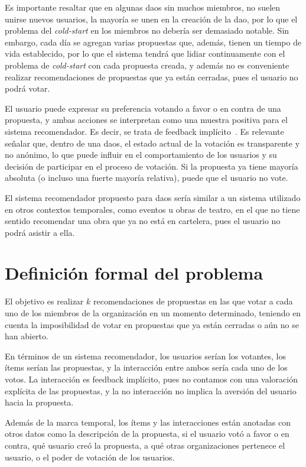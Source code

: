 Es importante resaltar que en algunas \glspl{dao} sin muchos miembros, no suelen unirse nuevos usuarios, la mayoría se unen en la creación de la \gls{dao}, por lo que el problema del \textit{cold-start} en los miembros no debería ser demasiado notable. Sin embargo, cada día se agregan varias propuestas que, además, tienen un tiempo de vida establecido, por lo que el sistema tendrá que lidiar continuamente con el problema de \textit{cold-start} con cada propuesta creada, y además no es conveniente realizar recomendaciones de propuestas que ya están cerradas, pues el usuario no podrá votar.

El usuario puede expresar su preferencia votando a favor o en contra de una propuesta, y ambas acciones se interpretan como una muestra positiva para el sistema recomendador. Es decir, se trata de feedback implícito~\cite{oard_implicit_1998}. Es relevante señalar que, dentro de una \glspl{dao}, el estado actual de la votación es transparente y no anónimo, lo que puede influir en el comportamiento de los usuarios y su decisión de participar en el proceso de votación. Si la propuesta ya tiene mayoría absoluta (o incluso una fuerte mayoría relativa), puede que el usuario no vote.

El sistema recomendador propuesto para \glspl{dao} sería similar a un sistema utilizado en otros contextos temporales, como eventos u obras de teatro, en el que no tiene sentido recomendar una obra que ya no está en cartelera, pues el usuario no podrá asistir a ella.

\section{Definición formal del problema}

El objetivo es realizar $k$ recomendaciones de propuestas en las que votar a cada uno de los miembros de la organización en un momento determinado, teniendo en cuenta la imposibilidad de votar en propuestas que ya están cerradas o aún no se han abierto.

En términos de un sistema recomendador, los usuarios serían los votantes, los ítems serían las propuestas, y la interacción entre ambos sería cada uno de los votos. La interacción es feedback implícito, pues no contamos con una valoración explícita de las propuestas, y la no interacción no implica la aversión del usuario hacia la propuesta.

Además de la marca temporal, los ítems y las interacciones están anotadas con otros datos como la descripción de la propuesta, si el usuario votó a favor o en contra, qué usuario creó la propuesta, a qué otras organizaciones pertenece el usuario, o el poder de votación de los usuarios.

